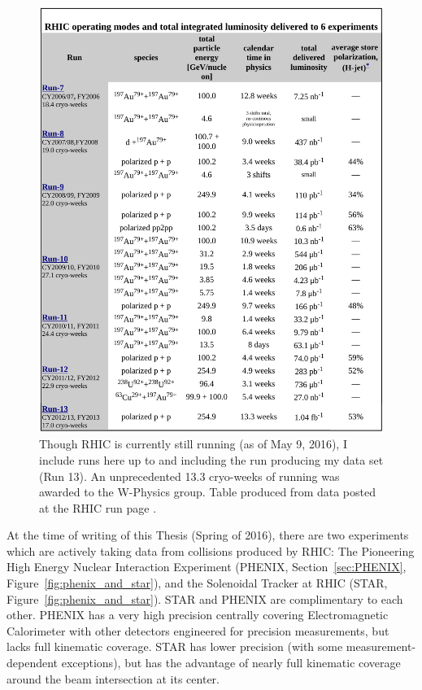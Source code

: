 \begin{figure}[ht]
  \centering
  \includegraphics[width=0.8\linewidth]{./figures/rhic_late_run_summary.png}
  \caption{ 
    Though RHIC is currently still running (as of May 9, 2016), I include runs
    here up to and including the run producing my data set (Run 13). An
    unprecedented 13.3 cryo-weeks of running was awarded to the W-Physics
    group.  Table produced from data posted at the RHIC run
    page \cite{Fischer2016}.
  }
  \label{fig:rhic_late_run_summary}
\end{figure}

At the time of writing of this Thesis (Spring of 2016), there are two
experiments which are actively taking data from collisions produced by RHIC: The
Pioneering High Energy Nuclear Interaction Experiment (PHENIX,
Section~\ref{sec:PHENIX}, Figure~\ref{fig:phenix_and_star}), and the Solenoidal
Tracker at RHIC (STAR, Figure~\ref{fig:phenix_and_star}). STAR and PHENIX are
complimentary to each other. PHENIX has a very high precision centrally covering
Electromagnetic Calorimeter with other detectors engineered for precision
measurements, but lacks full kinematic coverage. STAR has lower precision (with
some measurement-dependent exceptions), but has the advantage of nearly full
kinematic coverage around the beam intersection at its center.

